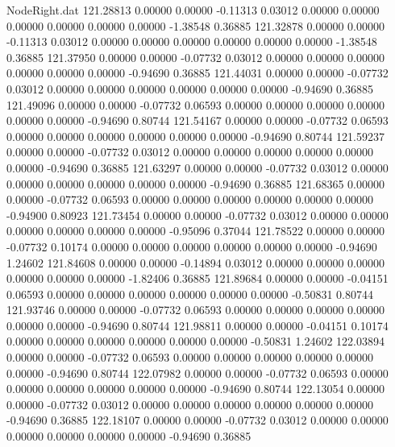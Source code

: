 \begin{filecontents}{NodeRight.dat}
 121.28813    0.00000    0.00000    -0.11313    0.03012    0.00000    0.00000    0.00000    0.00000    0.00000    0.00000   -1.38548    0.36885
 121.32878    0.00000    0.00000    -0.11313    0.03012    0.00000    0.00000    0.00000    0.00000    0.00000    0.00000   -1.38548    0.36885
 121.37950    0.00000    0.00000    -0.07732    0.03012    0.00000    0.00000    0.00000    0.00000    0.00000    0.00000   -0.94690    0.36885
 121.44031    0.00000    0.00000    -0.07732    0.03012    0.00000    0.00000    0.00000    0.00000    0.00000    0.00000   -0.94690    0.36885
 121.49096    0.00000    0.00000    -0.07732    0.06593    0.00000    0.00000    0.00000    0.00000    0.00000    0.00000   -0.94690    0.80744
 121.54167    0.00000    0.00000    -0.07732    0.06593    0.00000    0.00000    0.00000    0.00000    0.00000    0.00000   -0.94690    0.80744
 121.59237    0.00000    0.00000    -0.07732    0.03012    0.00000    0.00000    0.00000    0.00000    0.00000    0.00000   -0.94690    0.36885
 121.63297    0.00000    0.00000    -0.07732    0.03012    0.00000    0.00000    0.00000    0.00000    0.00000    0.00000   -0.94690    0.36885
 121.68365    0.00000    0.00000    -0.07732    0.06593    0.00000    0.00000    0.00000    0.00000    0.00000    0.00000   -0.94900    0.80923
 121.73454    0.00000    0.00000    -0.07732    0.03012    0.00000    0.00000    0.00000    0.00000    0.00000    0.00000   -0.95096    0.37044
 121.78522    0.00000    0.00000    -0.07732    0.10174    0.00000    0.00000    0.00000    0.00000    0.00000    0.00000   -0.94690    1.24602
 121.84608    0.00000    0.00000    -0.14894    0.03012    0.00000    0.00000    0.00000    0.00000    0.00000    0.00000   -1.82406    0.36885
 121.89684    0.00000    0.00000    -0.04151    0.06593    0.00000    0.00000    0.00000    0.00000    0.00000    0.00000   -0.50831    0.80744
 121.93746    0.00000    0.00000    -0.07732    0.06593    0.00000    0.00000    0.00000    0.00000    0.00000    0.00000   -0.94690    0.80744
 121.98811    0.00000    0.00000    -0.04151    0.10174    0.00000    0.00000    0.00000    0.00000    0.00000    0.00000   -0.50831    1.24602
 122.03894    0.00000    0.00000    -0.07732    0.06593    0.00000    0.00000    0.00000    0.00000    0.00000    0.00000   -0.94690    0.80744
 122.07982    0.00000    0.00000    -0.07732    0.06593    0.00000    0.00000    0.00000    0.00000    0.00000    0.00000   -0.94690    0.80744
 122.13054    0.00000    0.00000    -0.07732    0.03012    0.00000    0.00000    0.00000    0.00000    0.00000    0.00000   -0.94690    0.36885
 122.18107    0.00000    0.00000    -0.07732    0.03012    0.00000    0.00000    0.00000    0.00000    0.00000    0.00000   -0.94690    0.36885

\end{filecontents}
